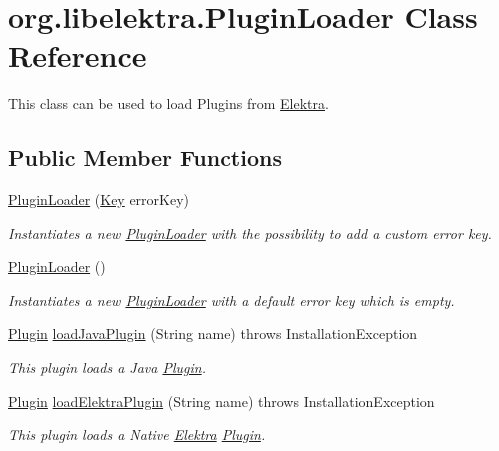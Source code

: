 \hypertarget{classorg_1_1libelektra_1_1PluginLoader}{}\section{org.\+libelektra.\+Plugin\+Loader Class Reference}
\label{classorg_1_1libelektra_1_1PluginLoader}


This class can be used to load Plugins from \mbox{\hyperlink{interfaceorg_1_1libelektra_1_1Elektra}{Elektra}}.  


\subsection*{Public Member Functions}
\begin{DoxyCompactItemize}
\item 
\mbox{\hyperlink{classorg_1_1libelektra_1_1PluginLoader_a4b09bcfc261043549a8f77d193fcf28a}{Plugin\+Loader}} (\mbox{\hyperlink{classorg_1_1libelektra_1_1Key}{Key}} error\+Key)
\begin{DoxyCompactList}\small\item\em Instantiates a new \mbox{\hyperlink{classorg_1_1libelektra_1_1PluginLoader}{Plugin\+Loader}} with the possibility to add a custom error key. \end{DoxyCompactList}\item 
\mbox{\label{classorg_1_1libelektra_1_1PluginLoader_aa0e69f9062f84be90509111b7f0824db}} 
\mbox{\hyperlink{classorg_1_1libelektra_1_1PluginLoader_aa0e69f9062f84be90509111b7f0824db}{Plugin\+Loader}} ()
\begin{DoxyCompactList}\small\item\em Instantiates a new \mbox{\hyperlink{classorg_1_1libelektra_1_1PluginLoader}{Plugin\+Loader}} with a default error key which is empty. \end{DoxyCompactList}\item 
\mbox{\hyperlink{interfaceorg_1_1libelektra_1_1Plugin}{Plugin}} \mbox{\hyperlink{classorg_1_1libelektra_1_1PluginLoader_af0eac085b1b966aaabfda24ad0836f43}{load\+Java\+Plugin}} (String name)  throws Installation\+Exception 	
\begin{DoxyCompactList}\small\item\em This plugin loads a Java \mbox{\hyperlink{interfaceorg_1_1libelektra_1_1Plugin}{Plugin}}. \end{DoxyCompactList}\item 
\mbox{\hyperlink{interfaceorg_1_1libelektra_1_1Plugin}{Plugin}} \mbox{\hyperlink{classorg_1_1libelektra_1_1PluginLoader_a0bf523c047b71f45a4f0cad2b3c7fb60}{load\+Elektra\+Plugin}} (String name)  throws Installation\+Exception 	
\begin{DoxyCompactList}\small\item\em This plugin loads a Native \mbox{\hyperlink{interfaceorg_1_1libelektra_1_1Elektra}{Elektra}} \mbox{\hyperlink{interfaceorg_1_1libelektra_1_1Plugin}{Plugin}}. \end{DoxyCompactList}\end{DoxyCompactItemize}


